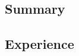 \documentclass[11pt,letterpaper]{article}
\begin{document}


\vspace{0.5em}

\subsection*{Summary}



\subsection*{Experience}




\end{document}
